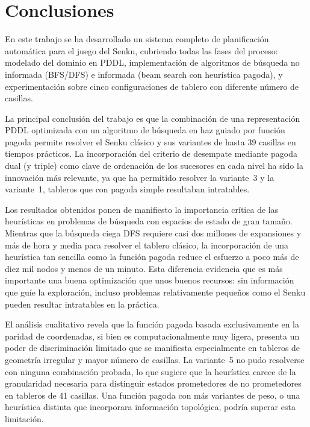 \documentclass[conference,a4paper]{IEEEtran}
\begin{document}
\section{Conclusiones}

En este trabajo se ha desarrollado un sistema completo de planificación
automática para el juego del Senku, cubriendo todas las fases del proceso:
modelado del dominio en PDDL, implementación de algoritmos de búsqueda no
informada (BFS/DFS) e informada (beam search con heurística pagoda), y
experimentación sobre cinco configuraciones de tablero con diferente número
de casillas.

La principal conclusión del trabajo es que la combinación de una
representación PDDL optimizada con un algoritmo de búsqueda en haz guiado
por función pagoda permite resolver el Senku clásico y sus variantes de
hasta 39 casillas en tiempos prácticos. La incorporación del criterio de
desempate mediante pagoda dual (y triple) como clave de ordenación de los
sucesores en cada nivel ha sido la innovación más relevante, ya que ha
permitido resolver la variante~3 y la variante~1, tableros que con pagoda
simple resultaban intratables.

Los resultados obtenidos ponen de manifiesto la importancia crítica de las
heurísticas en problemas de búsqueda con espacios de estado de gran tamaño.
Mientras que la búsqueda ciega DFS requiere casi dos millones de expansiones
y más de hora y media para resolver el tablero clásico, la incorporación de
una heurística tan sencilla como la función pagoda reduce el esfuerzo a poco
más de diez mil nodos y menos de un minuto. Esta diferencia evidencia que
es más importante una buena optimización que unos buenos recursos: sin
información que guíe la exploración, incluso problemas relativamente
pequeños como el Senku pueden resultar intratables en la práctica.

El análisis cualitativo revela que la función pagoda basada exclusivamente
en la paridad de coordenadas, si bien es computacionalmente muy ligera,
presenta un poder de discriminación limitado que se manifiesta
especialmente en tableros de geometría irregular y mayor número de casillas.
La variante~5 no pudo resolverse con ninguna combinación probada, lo que
sugiere que la heurística carece de la granularidad necesaria para
distinguir estados prometedores de no prometedores en tableros de 41
casillas. Una función pagoda con más variantes de peso, o una heurística
distinta que incorporara información topológica, podría superar esta
limitación.
\end{document}

